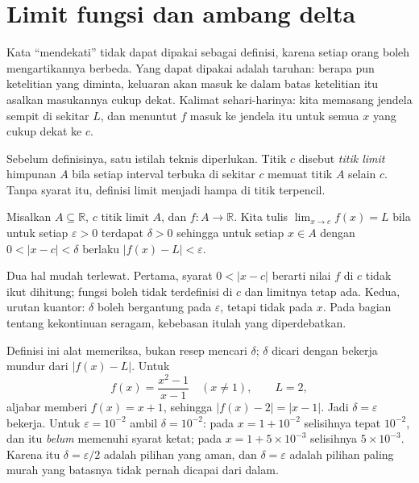 \section{Limit fungsi dan ambang delta}

Kata ``mendekati'' tidak dapat dipakai sebagai definisi, karena setiap orang boleh
mengartikannya berbeda. Yang dapat dipakai adalah taruhan: berapa pun ketelitian yang
diminta, keluaran akan masuk ke dalam batas ketelitian itu asalkan masukannya cukup
dekat. Kalimat sehari-harinya: kita memasang jendela sempit di sekitar $L$, dan
menuntut $f$ masuk ke jendela itu untuk semua $x$ yang cukup dekat ke $c$.


Sebelum definisinya, satu istilah teknis diperlukan. Titik $c$ disebut \emph{titik
limit} himpunan $A$ bila setiap interval terbuka di sekitar $c$
memuat titik $A$ selain $c$. Tanpa syarat itu, definisi limit menjadi hampa di titik
terpencil.

\begin{definisi}
Misalkan $A\subseteq\mathbb{R}$, $c$ titik limit $A$, dan $f\colon A\to\mathbb{R}$.
Kita tulis $\lim_{x\to c}f(x)=L$ bila untuk setiap $\varepsilon>0$ terdapat
$\delta>0$ sehingga untuk setiap $x\in A$ dengan $0<|x-c|<\delta$ berlaku
$|f(x)-L|<\varepsilon$.
\end{definisi}

Dua hal mudah terlewat. Pertama, syarat $0<|x-c|$ berarti nilai $f$ di $c$ tidak ikut
dihitung; fungsi boleh tidak terdefinisi di $c$ dan limitnya tetap ada. Kedua, urutan
kuantor: $\delta$ boleh bergantung pada $\varepsilon$, tetapi tidak pada $x$. Pada
bagian tentang kekontinuan seragam, kebebasan itulah yang diperdebatkan.

Definisi ini alat memeriksa, bukan resep mencari $\delta$; $\delta$ dicari dengan
bekerja mundur dari $|f(x)-L|$. Untuk
\[
f(x)=\frac{x^{2}-1}{x-1}\quad (x\neq 1),\qquad L=2,
\]
aljabar memberi $f(x)=x+1$, sehingga $|f(x)-2|=|x-1|$. Jadi $\delta=\varepsilon$
bekerja. Untuk $\varepsilon=10^{-2}$ ambil $\delta=10^{-2}$: pada $x=1+10^{-2}$
selisihnya tepat $10^{-2}$, dan itu \emph{belum} memenuhi syarat ketat; pada
$x=1+5\times10^{-3}$ selisihnya $5\times10^{-3}$. Karena itu $\delta=\varepsilon/2$ adalah pilihan
yang aman, dan $\delta=\varepsilon$ adalah pilihan paling murah yang batasnya tidak
pernah dicapai dari dalam.

